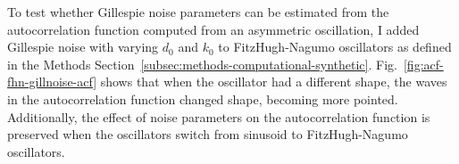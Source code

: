 To test whether Gillespie noise parameters can be estimated from the autocorrelation function computed from an asymmetric oscillation, I added Gillespie noise with varying $d_{0}$ and $k_{0}$ to FitzHugh-Nagumo oscillators as defined in the Methods Section~\ref{subsec:methods-computational-synthetic}.
Fig.\ \ref{fig:acf-fhn-gillnoise-acf} shows that when the oscillator had a different shape, the waves in the autocorrelation function changed shape, becoming more pointed.
Additionally, the effect of noise parameters on the autocorrelation function is preserved when the oscillators switch from sinusoid to FitzHugh-Nagumo oscillators.

